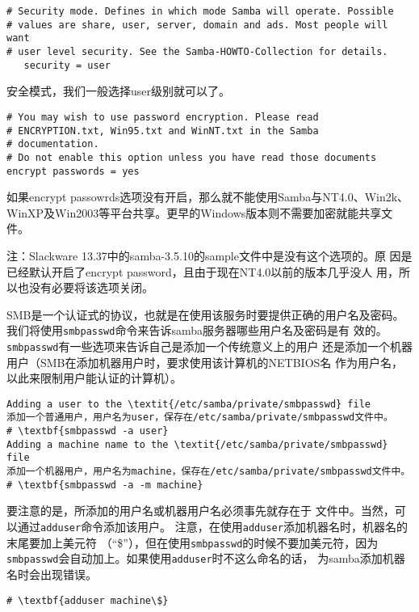 \begin{Verbatim}[frame=single,commandchars=\\\{\}]
# Security mode. Defines in which mode Samba will operate. Possible 
# values are share, user, server, domain and ads. Most people will want 
# user level security. See the Samba-HOWTO-Collection for details.
   security = user
\end{Verbatim}
安全模式，我们一般选择user级别就可以了。
\begin{Verbatim}[frame=single,commandchars=\\\{\}]
# You may wish to use password encryption. Please read
# ENCRYPTION.txt, Win95.txt and WinNT.txt in the Samba
# documentation.
# Do not enable this option unless you have read those documents
encrypt passwords = yes
\end{Verbatim}
如果encrypt passowrds选项没有开启，那么就不能使用Samba与NT4.0、Win2k、
WinXP及Win2003等平台共享。更早的Windows版本则不需要加密就能共享文件。

注：Slackware 13.37中的samba-3.5.10的sample文件中是没有这个选项的。原
因是已经默认开启了encrypt password，且由于现在NT4.0以前的版本几乎没人
用，所以也没有必要将该选项关闭。

SMB是一个认证式的协议，也就是在使用该服务时要提供正确的用户名及密码。
我们将使用\texttt{smbpasswd}命令来告诉samba服务器哪些用户名及密码是有
效的。\texttt{smbpasswd}有一些选项来告诉自己是添加一个传统意义上的用户
还是添加一个机器用户（SMB在添加机器用户时，要求使用该计算机的NETBIOS名
作为用户名，以此来限制用户能认证的计算机）。

\begin{Verbatim}[frame=single,commandchars=\\\{\}]
Adding a user to the \textit{/etc/samba/private/smbpasswd} file
添加一个普通用户，用户名为user，保存在/etc/samba/private/smbpasswd文件中。
# \textbf{smbpasswd -a user}
Adding a machine name to the \textit{/etc/samba/private/smbpasswd} file
添加一个机器用户，用户名为machine，保存在/etc/samba/private/smbpasswd文件中。
# \textbf{smbpasswd -a -m machine}
\end{Verbatim}

要注意的是，所添加的用户名或机器用户名必须事先就存在于
文件中。当然，可以通过\texttt{adduser}命令添加该用户。
注意，在使用\texttt{adduser}添加机器名时，机器名的末尾要加上美元符
（``\$''），但在使用\texttt{smbpasswd}的时候不要加美元符，因为
\texttt{smbpasswd}会自动加上。如果使用\texttt{adduser}时不这么命名的话，
为samba添加机器名时会出现错误。
\begin{Verbatim}[frame=single,commandchars=\\\{\}]
# \textbf{adduser machine\$}
\end{Verbatim}


